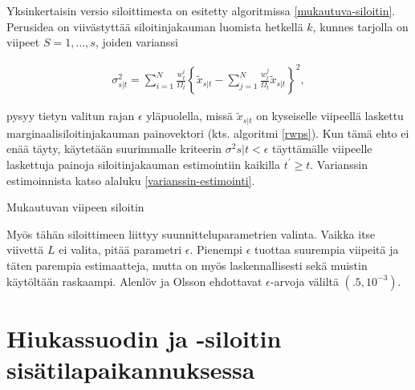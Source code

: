 \documentclass[
  12pt,
  a4paper, twoside]{book}
\begin{document}
Yksinkertaisin versio siloittimesta on esitetty algoritmissa \ref{mukautuva-siloitin}. Perusidea on viivästyttää siloitinjakauman luomista hetkellä \(k\), kunnes tarjolla on viipeet \(S=1,\ldots,s\), joiden varianssi

\begin{align}\label{siloitin-varianssi}
\sigma^2_{s|t} = \sum_{i=1}^N \frac{w_t^i}{\Omega_t}\left\{\tilde{x}_{s|t} - \sum_{j=1}^N \frac{w_t^j}{\Omega_t}\tilde{x}_{s|t} \right\}^2,
\end{align}

pysyy tietyn valitun rajan \(\epsilon\) yläpuolella, missä \(\tilde{x}_{s|t}\) on kyseiselle viipeellä laskettu marginaalisiloitinjakauman painovektori (kts. algoritmi \ref{rwps}). Kun tämä ehto ei enää täyty, käytetään suurimmalle kriteerin \(\sigma^2{s|t} < \epsilon\) täyttämälle viipeelle laskettuja painoja siloitinjakauman estimointiin kaikilla \(t^\prime \ge t\). Varianssin estimoinnista katso alaluku \ref{varianssin-estimointi}.

\begin{algorithm}[H]
\label{mukautuva-siloitin}
\DontPrintSemicolon
\SetAlgoShortEnd
{}
\caption{Mukautuvan viipeen siloitin}
\end{algorithm}

Myös tähän siloittimeen liittyy suunnitteluparametrien valinta. Vaikka itse viivettä \(L\) ei valita, pitää parametri \(\epsilon\). Pienempi \(\epsilon\) tuottaa suurempia viipeitä ja täten parempia estimaatteja, mutta on myös laskennallisesti sekä muistin käytöltään raskaampi. Alenlöv ja Olsson ehdottavat \(\epsilon\)-arvoja väliltä \((.5, 10^{-3})\).

\chapter{Hiukassuodin ja -siloitin sisätilapaikannuksessa} \label{paikannusesimerkki}
\end{document}
